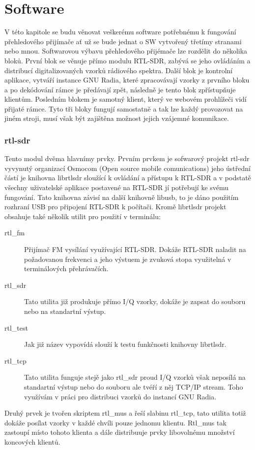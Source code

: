\documentclass{ctuthesis}
\begin{document}
\chapter{Software}
V této kapitole se budu věnovat veškerému software potřebnému k fungování přehledového přijímače ať už se bude jednat o SW vytvořený třetímy stranami nebo mnou. Softwarovou výbavu přehledového přijémače lze rozdělit do několika bloků. První blok se věnuje přímo modulu RTL-SDR, zabývá se jeho ovládáním a distribucí digitalizovaných vzorků rádiového spektra. Další blok je kontrolní aplikace, vytváří instance GNU Radia, které zpracovávají vzorky z prvního bloku a po dekódování rámce je předávají zpět, následně je tento blok zpřístupňuje klientům. Posledním blokem je samotný klient, který ve webovém prohlížeči vidí přijaté rámce. Tyto tři bloky fungují samostatně a tak lze každý provozovat na jiném stroji, musí však být zajištěna možnost jejich vzájemné komunikace.

\subsection{rtl-sdr}
Tento modul dvěma hlavnímy prvky. Prvním prvkem je sofwarový projekt rtl-sdr vyvynutý organizací Osmocom (Open source mobile comunications) jeho ústřední částí je knihovna librtlsdr \cite{osmocom} sloužící k ovládání a přístupu k RTL-SDR a v podstatě všechny uživatelské aplikace postavené na RTL-SDR jí potřebují ke svému fungování. Tato knihovna závisí na další knihovně libusb, to je dáno použitím rozhraní USB pro připojení RTL-SDR k počítači. Kromě librtlsdr projekt obsahuje také několik utilit pro použití v terminálu:
\begin{description}
\item[rtl_fm]
Přijímač FM vysílání využívající RTL-SDR. Dokáže RTL-SDR naladit na požadovanou frekvenci a jeho výstuem je zvuková stopa využitelná v terminálových přehrávačích.
\item[rtl_sdr]
Tato utilita již produkuje přímo I/Q vzorky, dokáže je zapsat do souboru nebo na standartní výstup.
\item[rtl_test]
Jak již název vypovídá slouží k testu funkčnosti knihovny librtlsdr.
\item[rtl_tcp]
Tato utilita funguje stejě jako rtl_sdr proud I/Q vzorků však neposílá na standartní výstup nebo do souboru ale tvéří z něj TCP/IP stream. Toho využívám v práci pro distribuci vzorků do instancí GNU Radia.
\end{description}
Druhý prvek je tvořen skriptem rtl_mus\cite{rtl_mus} a řeší slabinu rtl_tcp, tato utilita totiž dokáže posílat vzorky v každé chvíli pouze jednomu klientu. Rtl_mus tak zastoupí místo tohoto klienta a dále distribuuje prvky libovolnému množství koncových klientů.
\end{document}
